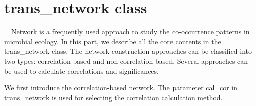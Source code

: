 \documentclass[
]{book}
\newenvironment{Shaded}{\begin{snugshade}}{\end{snugshade}}
\newcommand{\AttributeTok}[1]{\textcolor[rgb]{0.77,0.63,0.00}{#1}}
\newcommand{\CommentTok}[1]{\textcolor[rgb]{0.56,0.35,0.01}{\textit{#1}}}
\newcommand{\DecValTok}[1]{\textcolor[rgb]{0.00,0.00,0.81}{#1}}
\newcommand{\FloatTok}[1]{\textcolor[rgb]{0.00,0.00,0.81}{#1}}
\newcommand{\FunctionTok}[1]{\textcolor[rgb]{0.00,0.00,0.00}{#1}}
\newcommand{\NormalTok}[1]{#1}
\newcommand{\OtherTok}[1]{\textcolor[rgb]{0.56,0.35,0.01}{#1}}
\newcommand{\SpecialCharTok}[1]{\textcolor[rgb]{0.00,0.00,0.00}{#1}}
\newcommand{\StringTok}[1]{\textcolor[rgb]{0.31,0.60,0.02}{#1}}
\begin{document}
\hypertarget{trans_network-class}{%
\section{trans\_network class}\label{trans_network-class}}

　Network is a frequently used approach to study the co-occurrence patterns in microbial ecology\citep{Deng_Molecular_2012, Faust_Microbial_2012, Coyte_Theecology_2015}.
In this part, we describe all the core contents in the trans\_network class.
The network construction approaches can be classified into two types: correlation-based and non correlation-based.
Several approaches can be used to calculate correlations and significances.

We first introduce the correlation-based network. The parameter cal\_cor in trans\_network is used for selecting the correlation calculation method.

\begin{Shaded}
\end{Shaded}

\begin{Shaded}
\end{Shaded}
\end{document}
